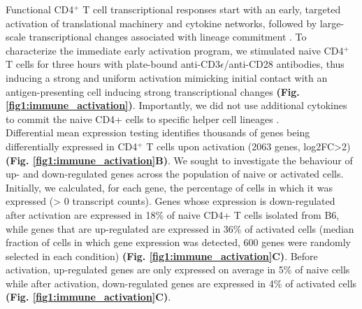 Functional CD4$^+$ T cell transcriptional responses start with an early, targeted activation of translational machinery and cytokine networks, followed by large-scale transcriptional changes associated with lineage commitment \citep{Shay2013, Asmal2003}. To characterize the immediate early activation program, we stimulated naive CD4$^+$ T cells for three hours with plate-bound anti-CD3$\epsilon$/anti-CD28 antibodies, thus inducing a strong and uniform activation mimicking initial contact with an antigen-presenting cell inducing strong transcriptional changes \textbf{(Fig. \ref{fig1:immune_activation})}. Importantly, we did not use additional cytokines to commit the naive CD4+ cells to specific helper cell lineages \citep{Zhu2010}. \\
Differential mean expression testing identifies thousands of genes being differentially expressed in CD4$^+$ T cells upon activation (2063 genes, log2FC>2) \textbf{(Fig. \ref{fig1:immune_activation}B)}. We sought to investigate the behaviour of up- and down-regulated genes across the population of naive or activated cells. Initially, we calculated, for each gene, the percentage of cells in which it was expressed (> 0 transcript counts). Genes whose expression is down-regulated after activation are expressed in 18\% of naive CD4+ T cells isolated from B6, while genes that are up-regulated are expressed in 36\% of activated cells (median fraction of cells in which gene expression was detected, 600 genes were randomly selected in each condition) \textbf{(Fig. \ref{fig1:immune_activation}C)}. Before activation, up-regulated genes are only expressed on average in 5\% of naive cells while after activation, down-regulated genes are expressed in 4\% of activated cells \textbf{(Fig. \ref{fig1:immune_activation}C)}. 

\newpage

